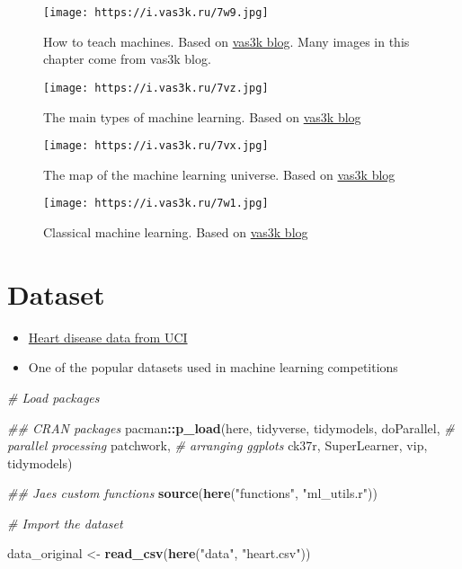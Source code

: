 \documentclass[
]{book}
\newenvironment{Shaded}{\begin{snugshade}}{\end{snugshade}}
\newcommand{\CommentTok}[1]{\textcolor[rgb]{0.56,0.35,0.01}{\textit{#1}}}
\newcommand{\KeywordTok}[1]{\textcolor[rgb]{0.13,0.29,0.53}{\textbf{#1}}}
\newcommand{\NormalTok}[1]{#1}
\newcommand{\OperatorTok}[1]{\textcolor[rgb]{0.81,0.36,0.00}{\textbf{#1}}}
\newcommand{\StringTok}[1]{\textcolor[rgb]{0.31,0.60,0.02}{#1}}
\begin{document}
\begin{figure}
\centering
\texttt{[image: https://i.vas3k.ru/7w9.jpg]}
\caption{How to teach machines. Based on \href{https://vas3k.com/blog/machine_learning/}{vas3k blog}. Many images in this chapter come from vas3k blog.}
\end{figure}

\begin{figure}
\centering
\texttt{[image: https://i.vas3k.ru/7vz.jpg]}
\caption{The main types of machine learning. Based on \href{https://vas3k.com/blog/machine_learning/}{vas3k blog}}
\end{figure}

\begin{figure}
\centering
\texttt{[image: https://i.vas3k.ru/7vx.jpg]}
\caption{The map of the machine learning universe. Based on \href{https://vas3k.com/blog/machine_learning/}{vas3k blog}}
\end{figure}

\begin{figure}
\centering
\texttt{[image: https://i.vas3k.ru/7w1.jpg]}
\caption{Classical machine learning. Based on \href{https://vas3k.com/blog/machine_learning/}{vas3k blog}}
\end{figure}

\hypertarget{dataset}{%
\section{Dataset}\label{dataset}}

\begin{itemize}
\item
  \href{https://archive.ics.uci.edu/ml/datasets/heart+Disease}{Heart disease data from UCI}
\item
  One of the popular datasets used in machine learning competitions
\end{itemize}

\begin{Shaded}
\begin{Highlighting}[]
\CommentTok{\# Load packages }

\CommentTok{\#\# CRAN packages }
\NormalTok{pacman}\OperatorTok{::}\KeywordTok{p\_load}\NormalTok{(here,}
\NormalTok{               tidyverse, }
\NormalTok{               tidymodels,}
\NormalTok{               doParallel, }\CommentTok{\# parallel processing }
\NormalTok{               patchwork, }\CommentTok{\# arranging ggplots}
\NormalTok{               ck37r, }
\NormalTok{               SuperLearner, }
\NormalTok{               vip, }
\NormalTok{               tidymodels)}

\CommentTok{\#\# Jae\textquotesingle{}s custom functions }
\KeywordTok{source}\NormalTok{(}\KeywordTok{here}\NormalTok{(}\StringTok{"functions"}\NormalTok{, }\StringTok{"ml\_utils.r"}\NormalTok{))}

\CommentTok{\# Import the dataset }

\NormalTok{data\_original \textless{}{-}}\StringTok{ }\KeywordTok{read\_csv}\NormalTok{(}\KeywordTok{here}\NormalTok{(}\StringTok{"data"}\NormalTok{, }\StringTok{"heart.csv"}\NormalTok{))}
\end{Highlighting}
\end{Shaded}
\end{document}
